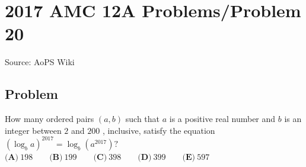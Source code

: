 \documentclass[12pt]{article}
\begin{document}
\section*{{2017 AMC 12A Problems/Problem 20}}
Source: AoPS Wiki

\subsection*{Problem}
How many ordered pairs $(a,b)$ such that $a$ is a positive real number and $b$ is an integer between $2$ and $200$ , inclusive, satisfy the equation $(\log_b a)^{2017}=\log_b(a^{2017})?$ $\textbf{(A)}\ 198\qquad\textbf{(B)}\ 199\qquad\textbf{(C)}\ 398\qquad\textbf{(D)}\ 399\qquad\textbf{(E)}\ 597$
\end{document}
